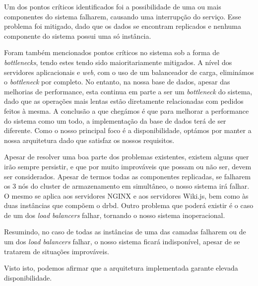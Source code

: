 Um dos pontos críticos identificados foi a possibilidade de uma ou mais componentes do sistema falharem, causando uma interrupção do serviço. Esse problema foi mitigado, dado que os dados se encontram replicados e nenhuma componente do sistema possui uma só instância.

Foram também mencionados pontos críticos no sistema sob a forma de \textit{bottlenecks}, tendo estes tendo sido maioritariamente mitigados. A nível dos servidores aplicacionais e \textit{web}, com o uso de um balanceador de carga, eliminámos o \textit{bottleneck} por completo. No entanto, na nossa base de dados, apesar das melhorias de performance, esta continua em parte a ser um \textit{bottleneck} do sistema, dado que as operações mais lentas estão diretamente relacionadas com pedidos feitos à mesma. A conclusão a que chegámos é que para melhorar a performance do sistema como um todo, a implementação da base de dados terá de ser diferente. Como o nosso principal foco é a disponibilidade, optámos por manter a nossa arquitetura dado que satisfaz os nossos requisitos. 

Apesar de resolver uma boa parte dos problemas existentes, existem alguns quer irão sempre persistir, e que por muito improváveis que possam ou não ser, devem ser considerados. Apesar de termos todas as componentes replicadas, se falharem os 3 nós do cluster de armazenamento em simultâneo, o nosso sistema irá falhar. O mesmo se aplica aos servidores NGINX e aos servidores Wiki.js, bem como às duas instâncias que compõem o drbd. Outro problema que poderá existir é o caso de um dos \textit{load balancers} falhar, tornando o nosso sistema inoperacional.

Resumindo, no caso de todas as instâncias de uma das camadas falharem ou de um dos \textit{load balancers} falhar, o nosso sistema ficará indisponível, apesar de se tratarem de situações improváveis. 

Visto isto, podemos afirmar que a arquitetura implementada garante elevada disponibilidade.

\pagebreak